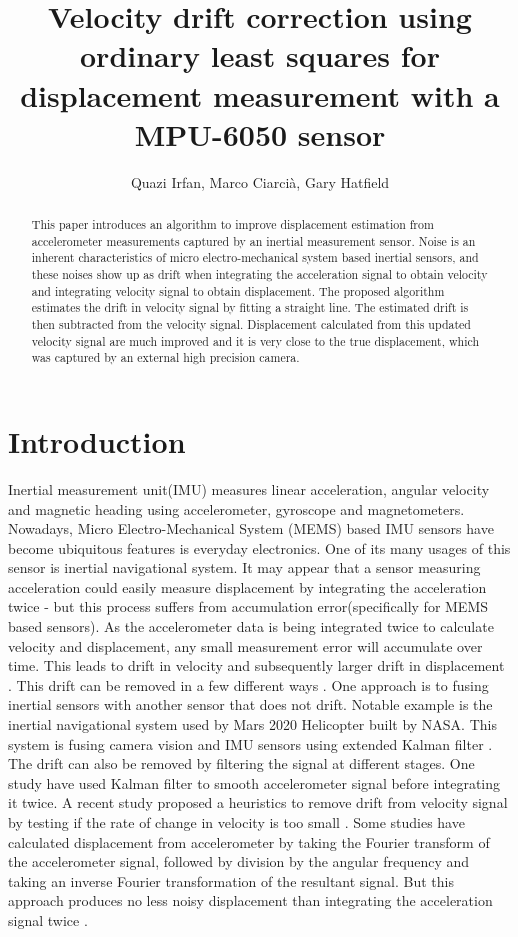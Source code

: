\documentclass{article}
\title{Velocity drift correction using ordinary least squares for displacement measurement with a MPU-6050 sensor}
\author{Quazi Irfan, Marco Ciarcià, Gary Hatfield}
\begin{document}
\maketitle
\begin{abstract}

This paper introduces an algorithm to improve displacement estimation from accelerometer measurements captured by an inertial measurement sensor. Noise is an inherent characteristics of micro electro-mechanical system based inertial sensors, and these noises show up as drift when integrating the acceleration signal to obtain velocity and integrating velocity signal to obtain displacement. The proposed algorithm estimates the drift in velocity signal by fitting a straight line. The estimated drift is then subtracted from the velocity signal. Displacement calculated from this updated velocity signal are much improved and it is very close to the true displacement, which was captured by an external high precision camera.

\end{abstract}
\section{Introduction}
Inertial measurement unit(IMU) measures linear acceleration, angular velocity and magnetic heading using accelerometer, gyroscope and magnetometers. Nowadays, Micro Electro-Mechanical System (MEMS) based IMU sensors have become ubiquitous features is everyday electronics. One of its many usages of this sensor is inertial navigational system. It may appear that a sensor measuring acceleration could easily measure displacement by integrating the acceleration twice - but this process suffers from accumulation error(specifically for MEMS based sensors). As the accelerometer data is being integrated twice to calculate velocity and displacement, any small measurement error will accumulate over time. This leads to drift in velocity and subsequently larger drift in displacement \cite{woodman2007introduction}. This drift can be removed in a few different ways \cite{han_random_2020}. One approach is to fusing inertial sensors with another sensor that does not drift. Notable example is the inertial navigational system used by Mars 2020 Helicopter built by NASA. This system is fusing camera vision and IMU sensors using extended Kalman filter \cite{bayard_vision-based_2019}. The drift can also be removed by filtering the signal at different stages. One study have used Kalman filter to smooth accelerometer signal before integrating it twice\cite{pang_evaluation_nodate}. A recent study proposed a heuristics to remove drift from velocity signal by testing if the rate of change in velocity is too small \cite{du2015signal}. Some studies have  calculated displacement from accelerometer by taking the Fourier transform of the accelerometer signal, followed by division by the angular frequency and taking an inverse Fourier transformation of the resultant signal. But this approach produces no less noisy displacement than integrating the acceleration signal twice \cite{brandt2014integrating, han2003retrieving}.
\end{document}

